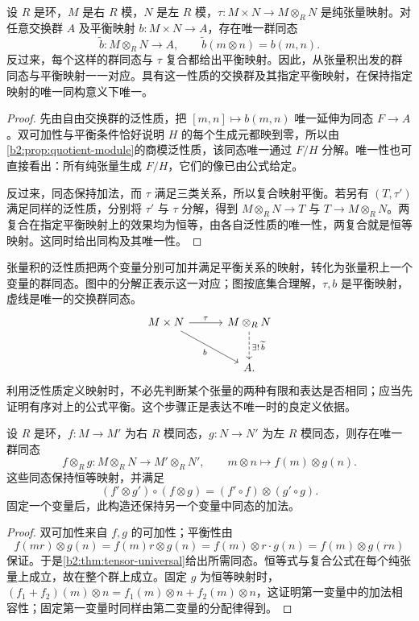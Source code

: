 \begin{theorem}[张量积的泛性质]\label{b2:thm:tensor-universal}
	设 \(R\) 是环，\(M\) 是右 \(R\) 模，\(N\) 是左 \(R\) 模，\(\tau:M\times N\to M\otimes_RN\) 是纯张量映射。对任意交换群 \(A\) 及平衡映射 \(b:M\times N\to A\)，存在唯一群同态
	\[
		\widetilde b:M\otimes_R N\longrightarrow A, \qquad \widetilde b(m\otimes n)=b(m,n).
	\]
	反过来，每个这样的群同态与 \(\tau\) 复合都给出平衡映射。因此，从张量积出发的群同态与平衡映射一一对应。具有这一性质的交换群及其指定平衡映射，在保持指定映射的唯一同构意义下唯一。
\end{theorem}
\begin{proof}
	先由自由交换群的泛性质，把 \([m,n]\mapsto b(m,n)\) 唯一延伸为同态 \(F\to A\)。双可加性与平衡条件恰好说明 \(H\) 的每个生成元都映到零，所以由\cref{b2:prop:quotient-module}的商模泛性质，该同态唯一通过 \(F/H\) 分解。唯一性也可直接看出：所有纯张量生成 \(F/H\)，它们的像已由公式给定。

	反过来，同态保持加法，而 \(\tau\) 满足三类关系，所以复合映射平衡。若另有 \((T,\tau')\) 满足同样的泛性质，分别将 \(\tau'\) 与 \(\tau\) 分解，得到 \(M\otimes_RN\to T\) 与 \(T\to M\otimes_RN\)。两复合在指定平衡映射上的效果均为恒等，由各自泛性质的唯一性，两复合就是恒等映射。这同时给出同构及其唯一性。
\end{proof}

张量积的泛性质把两个变量分别可加并满足平衡关系的映射，转化为张量积上一个变量的群同态。图中的分解正表示这一对应；图按底集合理解，\(\tau,b\) 是平衡映射，虚线是唯一的交换群同态。
\[
	\begin{tikzcd}[column sep=3em,row sep=2.5em]
		M\times N\arrow[r,"\tau"]\arrow[dr,"b"']&M\otimes_RN\arrow[d,dashed,"\exists!\,\widetilde b"]\\
		&A.
	\end{tikzcd}
\]
利用泛性质定义映射时，不必先判断某个张量的两种有限和表达是否相同；应当先证明有序对上的公式平衡。这个步骤正是表达不唯一时的良定义依据。

\begin{proposition}\label{b2:prop:tensor-maps}
	设 \(R\) 是环，\(f:M\to M'\) 为右 \(R\) 模同态，\(g:N\to N'\) 为左 \(R\) 模同态，则存在唯一群同态
	\[
		f\otimes_R g:M\otimes_R N\longrightarrow M'\otimes_R N', \qquad m\otimes n\longmapsto f(m)\otimes g(n).
	\]
	这些同态保持恒等映射，并满足
	\[
		(f'\otimes g')\circ(f\otimes g)=(f'\circ f)\otimes(g'\circ g).
	\]
	固定一个变量后，此构造还保持另一个变量中同态的加法。
\end{proposition}
\begin{proof}
	双可加性来自 \(f,g\) 的可加性；平衡性由
	\[
		f(mr)\otimes g(n)=f(m)r\otimes g(n) =f(m)\otimes r\cdot g(n)=f(m)\otimes g(rn)
	\]
	保证。于是\cref{b2:thm:tensor-universal}给出所需同态。恒等式与复合公式在每个纯张量上成立，故在整个群上成立。固定 \(g\) 为恒等映射时，\((f_1+f_2)(m)\otimes n=f_1(m)\otimes n+f_2(m)\otimes n\)，这证明第一变量中的加法相容性；固定第一变量时同样由第二变量的分配律得到。
\end{proof}

